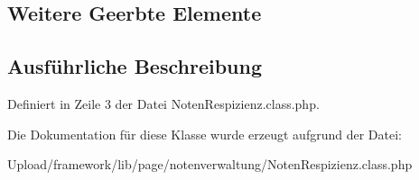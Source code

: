 \subsection*{Weitere Geerbte Elemente}


\subsection{Ausführliche Beschreibung}


Definiert in Zeile 3 der Datei Noten\+Respizienz.\+class.\+php.



Die Dokumentation für diese Klasse wurde erzeugt aufgrund der Datei\+:\begin{DoxyCompactItemize}
\item 
Upload/framework/lib/page/notenverwaltung/Noten\+Respizienz.\+class.\+php\end{DoxyCompactItemize}
